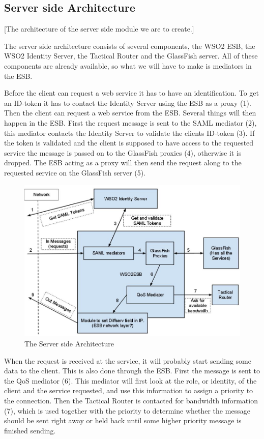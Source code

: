 \documentclass[12pt]{article}
\begin{document}
    \subsection{Server side Architecture}\label{serversidearch} [The architecture of the server side module we are to create.] 
    
        The server side architecture consists of several components, the WSO2 ESB, the WSO2 Identity Server, the Tactical Router and the GlassFish server. All of these components are already available, so what we will have to make is mediators in the ESB.

        Before the client can request a web service it has to have an identification. To get an ID-token it has to contact the Identity Server using the ESB as a proxy (1). Then the client can request a web service from the ESB. Several things will then happen in the ESB. First the request message is sent to the SAML mediator (2), this mediator contacts the Identity Server to validate the clients ID-token (3). If the token is validated and the client is supposed to have access to the requested service the message is passed on to the GlassFish proxies (4), otherwise it is dropped. The ESB acting as a proxy will then send the request along to the requested service on the GlassFish server (5).
        
        \begin{figure}[htb]
            \includegraphics[scale=0.4]{serverside}
            \caption{The Server side Architecture}
            \label{fig:serverside}
        \end{figure}

        When the request is received at the service, it will probably start sending some data to the client. This is also done through the ESB. First the message is sent to the QoS mediator (6). This mediator will first look at the role, or identity, of the client and the service requested, and use this information to assign a priority to the connection. Then the Tactical Router is contacted for bandwidth information (7), which is used together with the priority to determine whether the message should be sent right away or held back until some higher priority message is finished sending.
\end{document}
